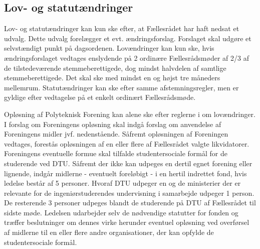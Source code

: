 \begin{list}
\subsection{Lov- og statutændringer}
\item \label{L:LS:aendringer} Lov- og statutændringer kan kun ske efter, at Fællesrådet har haft nedsat et udvalg. Dette udvalg forelægger et evt. ændringsforslag. Forslaget skal udgøre et selvstændigt punkt på dagsordenen. Lovændringer kan kun ske, hvis ændringsforslaget vedtages enslydende på 2 ordinære Fællesrådsmøder af 2/3 af de tilstedeværende stemmeberettigede, dog mindst halvdelen af samtlige stemmeberettigede. Det skal ske med mindst en og højst tre måneders mellemrum. Statutændringer kan ske efter samme afstemningsregler, men er gyldige efter vedtagelse på et enkelt ordinært Fællesrådsmøde.

\item Opløsning af Polyteknisk Forening kan alene ske efter reglerne i  om lovændringer. I forslag om Foreningens opløsning skal indgå forslag om anvendelse af Foreningens midler jvf. nedenstående. Såfremt opløsningen af Foreningen vedtages, forestås opløsningen af en eller flere af Fællesrådet valgte likvidatorer. Foreningens eventuelle formue skal tilfalde studentersociale formål for de studerende ved DTU. Såfremt der ikke kan udpeges en dertil egnet forening eller lignende, indgår midlerne - eventuelt foreløbigt - i en hertil indrettet fond, hvis ledelse består af 5 personer. Hvoraf DTU udpeger en og de ministerier der er relevante for de ingeniørstuderendes undervisning i samarbejde udpeger 1 person. De resterende 3 personer udpeges blandt de studerende på DTU af Fællesrådet til sidste møde. Ledelsen udarbejder selv de nødvendige statutter for fonden og træffer beslutninger om dennes virke herunder eventuel opløsning ved overførsel af midlerne til en eller flere andre organisationer, der kan opfylde de studentersociale formål.

\end{list}
